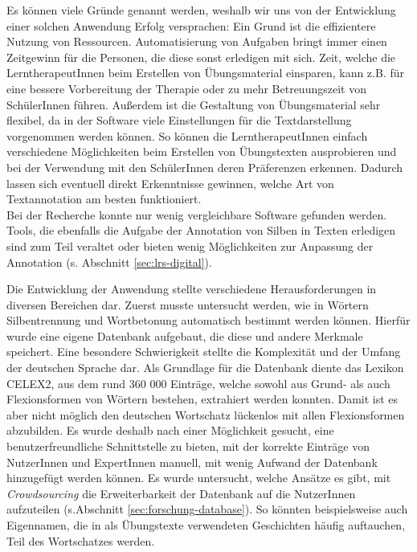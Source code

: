 Es können viele Gründe genannt werden, weshalb wir uns von der Entwicklung einer solchen Anwendung Erfolg versprachen: Ein Grund ist die effizientere Nutzung von Ressourcen. Automatisierung von Aufgaben bringt immer einen Zeitgewinn für die Personen, die diese sonst erledigen mit sich. Zeit, welche die LerntherapeutInnen beim Erstellen von Übungsmaterial einsparen, kann z.B. für eine bessere Vorbereitung der Therapie oder zu mehr Betreuungszeit von SchülerInnen führen. Außerdem ist die Gestaltung von Übungsmaterial sehr flexibel, da in der Software viele Einstellungen für die Textdarstellung vorgenommen werden können. So können die LerntherapeutInnen einfach verschiedene Möglichkeiten beim Erstellen von Übungstexten ausprobieren und bei der Verwendung mit den SchülerInnen deren Präferenzen erkennen. Dadurch lassen sich eventuell direkt Erkenntnisse gewinnen, welche Art von Textannotation am besten funktioniert.\\
Bei der Recherche konnte nur wenig vergleichbare Software gefunden werden. Tools, die ebenfalls die Aufgabe der Annotation von Silben in Texten erledigen sind zum Teil veraltet oder bieten wenig Möglichkeiten zur Anpassung der Annotation (s. Abschnitt \ref{sec:lrs-digital}).

Die Entwicklung der Anwendung stellte verschiedene Herausforderungen in diversen Bereichen dar. Zuerst musste untersucht werden, wie in Wörtern Silbentrennung und Wortbetonung automatisch bestimmt werden können. Hierfür wurde eine eigene Datenbank aufgebaut, die diese und andere Merkmale speichert. Eine besondere Schwierigkeit stellte die Komplexität und der Umfang der deutschen Sprache dar. Als Grundlage für die Datenbank diente das Lexikon CELEX2\cite{Burnage1990}, aus dem rund 360 000 Einträge, welche sowohl aus Grund- als auch Flexionsformen von Wörtern bestehen, extrahiert werden konnten. Damit ist es aber nicht möglich den deutschen Wortschatz lückenlos mit allen Flexionsformen abzubilden. Es wurde deshalb nach einer Möglichkeit gesucht, eine benutzerfreundliche Schnittstelle zu bieten, mit der korrekte Einträge von NutzerInnen und ExpertInnen manuell, mit wenig Aufwand der Datenbank hinzugefügt werden können. Es wurde untersucht, welche Ansätze es gibt, mit \textit{Crowdsourcing} die Erweiterbarkeit der Datenbank auf die NutzerInnen aufzuteilen (s.Abschnitt \ref{sec:forschung-database}). So könnten beispielsweise auch Eigennamen, die in als Übungstexte verwendeten Geschichten häufig auftauchen, Teil des Wortschatzes werden.\\

